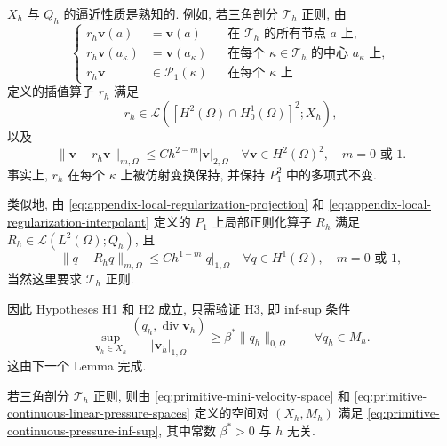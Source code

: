 $X_h$ 与 $Q_h$ 的逼近性质是熟知的. 例如, 若三角剖分 $\mathcal T_h$ 正则,
由
\begin{equation}\label{eq:primitive-mini-interpolant-definition}
\left\{
\begin{aligned}
r_h\mathbf v(a)&=\mathbf v(a)
&&\text{在 }\mathcal T_h\text{ 的所有节点 }a\text{ 上},\\
r_h\mathbf v(a_\kappa)&=\mathbf v(a_\kappa)
&&\text{在每个 }\kappa\in\mathcal T_h\text{ 的中心 }a_\kappa\text{ 上},\\
r_h\mathbf v&\in\mathcal P_1(\kappa)
&&\text{在每个 }\kappa\text{ 上}
\end{aligned}
\right.
\end{equation}
定义的插值算子 $r_h$ 满足
\[
r_h\in\mathcal L([H^2(\Omega)\cap H_0^1(\Omega)]^2;X_h),
\]
以及
\begin{equation}\label{eq:primitive-mini-interpolation-error}
\|\mathbf v-r_h\mathbf v\|_{m,\Omega}
\leq Ch^{2-m}|\mathbf v|_{2,\Omega}
\quad\forall\mathbf v\in H^2(\Omega)^2,
\quad m=0\text{ 或 }1.
\end{equation}
事实上, $r_h$ 在每个 $\kappa$ 上被仿射变换保持, 并保持 $P_1^2$ 中的多项式不变.

类似地, 由 \eqref{eq:appendix-local-regularization-projection} 和
\eqref{eq:appendix-local-regularization-interpolant} 定义的 $P_1$ 上局部正则化算子
$R_h$ 满足 $R_h\in\mathcal L(L^2(\Omega);Q_h)$, 且
\begin{equation}\label{eq:primitive-continuous-pressure-regularization-error}
\|q-R_hq\|_{m,\Omega}
\leq Ch^{1-m}|q|_{1,\Omega}
\quad\forall q\in H^1(\Omega),
\quad m=0\text{ 或 }1,
\end{equation}
当然这里要求 $\mathcal T_h$ 正则.

因此 Hypotheses H1 和 H2 成立, 只需验证 H3, 即 inf-sup 条件
\begin{equation}\label{eq:primitive-continuous-pressure-inf-sup}
\sup_{\mathbf v_h\in X_h}
\frac{(q_h,\operatorname{div}\mathbf v_h)}{|\mathbf v_h|_{1,\Omega}}
\geq\beta^*\|q_h\|_{0,\Omega}
\qquad\forall q_h\in M_h.
\end{equation}
这由下一个 Lemma 完成.

\setcounter{statement}{0}
\renewcommand{\theHstatement}{lemma.\thesection.\arabic{statement}}
\begin{Lemma}\label{lem:primitive-mini-inf-sup}
若三角剖分 $\mathcal T_h$ 正则, 则由
\eqref{eq:primitive-mini-velocity-space} 和
\eqref{eq:primitive-continuous-linear-pressure-spaces} 定义的空间对
$(X_h,M_h)$ 满足 \eqref{eq:primitive-continuous-pressure-inf-sup},
其中常数 $\beta^*>0$ 与 $h$ 无关.
\end{Lemma}

